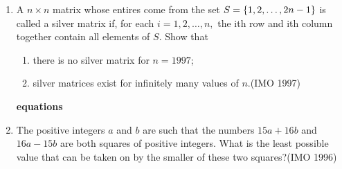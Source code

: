 \begin{enumerate}
\item A $n\times n$ matrix whose entires come from the set $S = \left\{1,2,\dots,2n-1\right\}$ is called a silver matrix if, for each ${i=1,2,\dots,n,}$ the ith row and ith column together contain all elements of $S$. Show that                                         \begin{enumerate}                                   \item there is no silver matrix for $n=1997$;      
\item silver matrices exist for infinitely many values of $n$.\hfill(IMO 1997) 
\end{enumerate}
\textbf{equations}
\item The positive integers $a$ and $b$ are such that the numbers $15a+16b$ and $16a-15b$ are both squares of positive integers. What is the least possible value that can be taken on by the smaller of these two squares?\hfill(IMO 1996)
\end{enumerate}	

